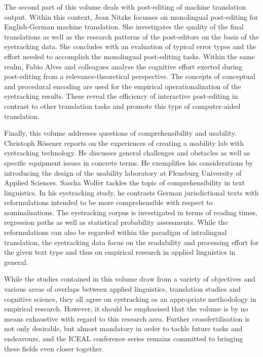 \documentclass[output=paper]{langsci/langscibook}
\begin{document}
The second part of this volume deals with post-editing of machine translation output. Within this context, Jean Nitzke focusses on monolingual post-editing for English-German machine translation. She investigates the quality of the final translations as well as the research patterns of the post-editors on the basis of the eyetracking data. She concludes with an evaluation of typical error types and the effort needed to accomplish the monolingual post-editing tasks. Within the same realm, Fabio Alves and colleagues analyse the cognitive effort exerted during post-editing from a relevance-theoretical perspective. The concepts of conceptual and procedural encoding are used for the empirical operationalization of the eyetracking results. These reveal the efficiency of interactive post-editing in contrast to other translation tasks and promote this type of computer-aided translation.

Finally, this volume addresses questions of comprehensibility and usability. Christoph Rösener reports on the experiences of creating a usability lab with eyetracking technology. He discusses general challenges and obstacles as well as specific equipment issues in concrete terms. He exemplifies his considerations by introducing the design of the usability laboratory at Flensburg University of Applied Sciences. Sascha Wolfer tackles the topic of comprehensibility in text linguistics. In his eyetracking study, he contrasts German jurisdictional texts with reformulations intended to be more comprehensible with respect to nominalisations. The eyetracking corpus is investigated in terms of reading times, regression paths as well as statistical probability assessments. While the reformulations can also be regarded within the paradigm of intralingual translation, the eyetracking data focus on the readability and processing effort for the given text type and thus on empirical research in applied linguistics in general.

While the studies contained in this volume draw from a variety of objectives and various areas of overlaps between applied linguistics, translation studies and cognitive science, they all agree on eyetracking as an appropriate methodology in empirical research. However, it should be emphasised that the volume is by no means exhaustive with regard to this research area. Further crossfertilisation is not only desirable, but almost mandatory in order to tackle future tasks and endeavours, and the ICEAL conference series remains committed to bringing these fields even closer together. 
\end{document}
